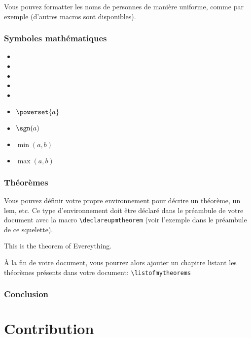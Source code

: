 \documentclass[french]{spimubphdthesis}
\begin{document}
Vous pouvez formatter les noms de personnes de manière uniforme, comme par exemple  (d'autres macros sont disponibles).

\section{Symboles mathématiques}

\begin{itemize}
\item \R
\item \N
\item \Z
\item \Q
\item \C
\item $\powerset{a}$
\item $\sgn(a)$
\item $\min(a, b)$
\item $\max(a, b)$
\end{itemize}

\section{Théorèmes}

Vous pouvez définir votre propre environnement pour décrire un théorème, un lem, etc.
Ce type d'environnement doit être déclaré dans le préambule de votre document avec la
macro \texttt{{\textbackslash}declareupmtheorem} (voir l'exemple dans le préambule de
ce squelette).

\begin{mytheorem}
This is the theorem of Evereything.
\end{mytheorem}

\`A la fin de votre document, vous pourrez alors ajouter un chapitre listant les théorèmes présents dans votre document: \texttt{{\textbackslash}listofmytheorems}

\section{Conclusion}
 
 
 
\part{Contribution}
\end{document}
